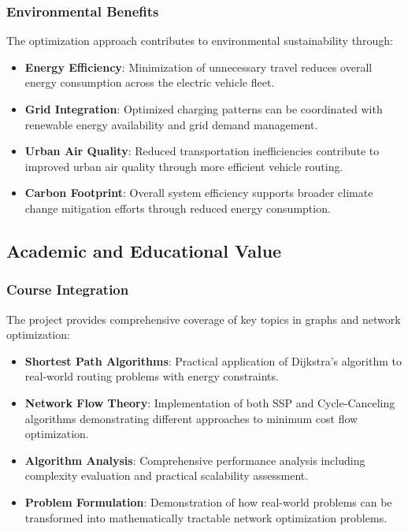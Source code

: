 \documentclass[12pt,a4paper]{article}
\begin{document}
\subsubsection{Environmental Benefits}

The optimization approach contributes to environmental sustainability through:

\begin{itemize}
\item \textbf{Energy Efficiency}: Minimization of unnecessary travel reduces overall energy consumption across the electric vehicle fleet.
\item \textbf{Grid Integration}: Optimized charging patterns can be coordinated with renewable energy availability and grid demand management.
\item \textbf{Urban Air Quality}: Reduced transportation inefficiencies contribute to improved urban air quality through more efficient vehicle routing.
\item \textbf{Carbon Footprint}: Overall system efficiency supports broader climate change mitigation efforts through reduced energy consumption.
\end{itemize}

\subsection{Academic and Educational Value}

\subsubsection{Course Integration}

The project provides comprehensive coverage of key topics in graphs and network optimization:

\begin{itemize}
\item \textbf{Shortest Path Algorithms}: Practical application of Dijkstra's algorithm to real-world routing problems with energy constraints.
\item \textbf{Network Flow Theory}: Implementation of both SSP and Cycle-Canceling algorithms demonstrating different approaches to minimum cost flow optimization.
\item \textbf{Algorithm Analysis}: Comprehensive performance analysis including complexity evaluation and practical scalability assessment.
\item \textbf{Problem Formulation}: Demonstration of how real-world problems can be transformed into mathematically tractable network optimization problems.
\end{itemize}
\end{document}
